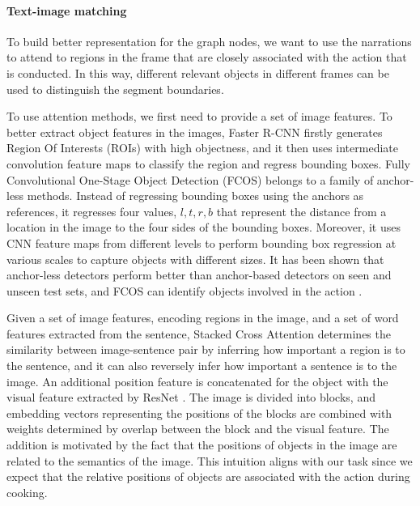 \paragraph{Text-image matching}
To build better representation for the graph nodes, we want to use the narrations to attend to regions in the frame that are closely associated with the action that is conducted. In this way, different relevant objects in different frames can be used to distinguish the segment boundaries. 

To use attention methods, we first need to provide a set of image features. To better extract object features in the images, Faster R-CNN \cite{ren2016faster} firstly generates Region Of Interests (ROIs) with high objectness, and it then uses intermediate convolution feature maps to classify the region and regress bounding boxes. Fully Convolutional One-Stage Object Detection (FCOS) \cite{tian2019fcos} belongs to a family of anchor-less methods. Instead of regressing bounding boxes using the anchors as references, it regresses four values, $l,t,r,b$ that represent the distance from a location in the image to the four sides of the bounding boxes. Moreover, it uses CNN feature maps from different levels to perform bounding box regression at various scales to capture objects with different sizes. It has been shown that anchor-less detectors perform better than anchor-based detectors on seen and unseen test sets, and FCOS can identify objects involved in the action \cite{yoon2020semisupervised}.  

Given a set of image features, encoding regions in the image, and a set of word features extracted from the sentence, Stacked Cross Attention \cite{lee2018stacked} determines the similarity between image-sentence pair by inferring how important a region is to the sentence, and it can also reversely infer how important a sentence is to the image. An additional position feature is concatenated for the object with the visual feature extracted by ResNet \cite{wang2019position}. The image is divided into blocks, and embedding vectors representing the positions of the blocks are combined with weights determined by overlap between the block and the visual feature. The addition is motivated by the fact that the positions of objects in the image are related to the semantics of the image. This intuition aligns with our task since we expect that the relative positions of objects are associated with the action during cooking.
